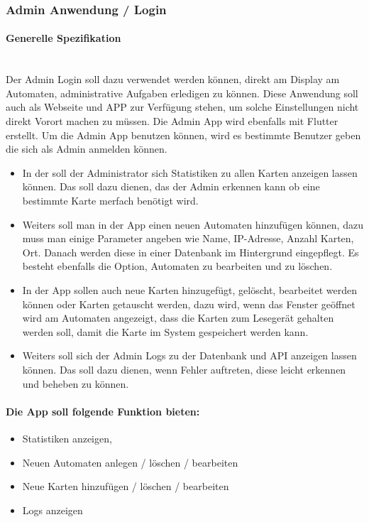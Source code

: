 \subsubsection{Admin Anwendung / Login}
\paragraph{Generelle Spezifikation}\mbox{}\\
Der Admin Login soll dazu verwendet werden können, direkt am Display am Automaten, administrative Aufgaben erledigen zu können. Diese Anwendung soll auch als Webseite und APP zur Verfügung stehen, um solche Einstellungen nicht direkt Vorort machen zu müssen. Die Admin App wird ebenfalls mit Flutter erstellt. Um die Admin App benutzen können, wird es bestimmte Benutzer geben die sich als Admin anmelden können.

\begin{itemize}
  \item In der soll der Administrator sich Statistiken zu allen Karten anzeigen lassen können. Das soll dazu dienen, das der Admin erkennen kann ob eine bestimmte Karte merfach benötigt wird.
  \item Weiters soll man in der App einen neuen Automaten hinzufügen können, dazu muss man einige Parameter angeben wie Name, IP-Adresse, Anzahl Karten, Ort. Danach werden diese in einer Datenbank im Hintergrund eingepflegt. Es besteht ebenfalls die Option, Automaten zu bearbeiten und zu löschen. 
  \item In der App sollen auch neue Karten hinzugefügt, gelöscht, bearbeitet werden können oder Karten getauscht werden, dazu wird, wenn das Fenster geöffnet wird am Automaten angezeigt, dass die Karten zum Lesegerät gehalten werden soll, damit die Karte im System gespeichert werden kann.
  \item Weiters soll sich der Admin Logs zu der Datenbank und API anzeigen lassen können. Das soll dazu dienen, wenn Fehler auftreten, diese leicht erkennen und beheben zu können.
\end{itemize}

\paragraph{Die App soll folgende Funktion bieten:}
\begin{itemize}
 \item Statistiken anzeigen,
 \item Neuen Automaten anlegen / löschen / bearbeiten 
 \item Neue Karten hinzufügen / löschen / bearbeiten
 \item Logs anzeigen
\end{itemize}

